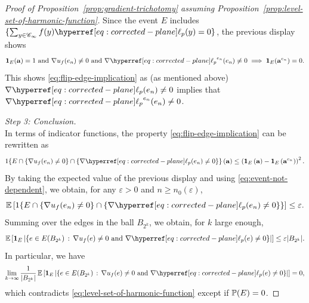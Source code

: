 \documentclass[12pt]{amsart}
\numberwithin{equation}{section}
\begin{document}
\begin{proof}[Proof of Proposition~\ref{prop:gradient-trichotomy} assuming Proposition~\ref{prop:level-set-of-harmonic-function}]
		Since the event $E$ includes $\{ \sum_{y \in \mathscr{C}_\infty} f(y) \ellp{p}(y)  = 0 \} $, the previous display shows
		\[
		\indc_{E}(\mathbf{a}) = 1 ~\mbox{and}~ \nabla u_f(e_n) \neq 0 ~\mbox{and}~  \nabla {\ellp{p}}^{e_n}(e_n) \neq 0 \implies \indc_{E}(\mathbf{a}^{e_n}) = 0.
		\]
		This shows \eqref{eq:flip-edge-implication} as (as mentioned above) $\nabla \ellp{p}(e_n) \neq 0$ implies that $\nabla {\ellp{p}}^{e_n}(e_n) \neq 0$. 
		\medskip
		
		
		
		{\it Step 3: Conclusion.} \\
		In terms of indicator functions, the property \eqref{eq:flip-edge-implication} can be rewritten as 
		\begin{equation*}
			1\{E \cap \left\{ \nabla u_f(e_n) \neq 0 \right\}\cap \left\{ \nabla \ellp{p}(e_n) \neq 0 \right\}\}  \left( \mathbf{a} \right) \leq  \left( \indc_{E} \left( \mathbf{a} \right) -  \indc_{E} \left( \mathbf{a}^{e_n} \right) \right)^2.
		\end{equation*}
		By taking the expected value of the previous display and using \eqref{eq:event-not-dependent}, we obtain, for any $\varepsilon > 0$ and $n \geq n_0(\varepsilon)$,
		\begin{equation*}
			\E \left[ 1\{E \cap \left\{ \nabla u_f(e_n) \neq 0 \right\}\cap \left\{ \nabla \ellp{p} (e_n) \neq 0 \right\}\} \right] \leq  \varepsilon.
		\end{equation*}
		Summing over the edges in the ball $B_{2^k}$, we obtain, for $k$ large enough,
		\begin{equation*}
			\E \left[ \indc_{E}\left| \left\{ e \in E(B_{2^k}) \, : \, \nabla u_f(e) \neq 0 ~\mbox{and}~ \nabla \ellp{p}(e) \neq 0 \right\} \right|  \right] \leq \varepsilon  |B_{2^k} | .
		\end{equation*}
		In particular, we have
		\begin{equation} \label{eq:no-sensitive-edges}
			\lim_{k \to \infty} \frac{1}{|B_{2^k}|}  \E \left[ \indc_{E} \left| \left\{ e \in E(B_{2^k}) \, : \, \nabla u_f(e) \neq 0 ~\mbox{and}~ \nabla \ellp{p}(e) \neq 0 \right\} \right|  \right] = 0,
		\end{equation}
		which contradicts \eqref{eq:level-set-of-harmonic-function} except if $\P(E) = 0$. \end{proof}
	
	
	
	
	
	
	
	
	
	
\end{document}
